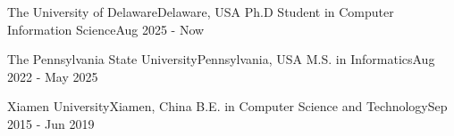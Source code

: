 \shorterSection{\textcolor{titleblue}{Education}}
\resumeSubHeadingListStart

\resumeSubheading
{The University of Delaware}{Delaware, USA}
{Ph.D Student in Computer Information Science}{Aug 2025 - Now}{
}

\resumeSubheading
{The Pennsylvania State University}{Pennsylvania, USA}
{M.S. in Informatics}{Aug 2022 - May 2025}{
}

\resumeSubheading
{Xiamen University}{Xiamen, China}
{B.E. in Computer Science and Technology}{Sep 2015 - Jun 2019}{
}
\resumeSubHeadingListEnd
